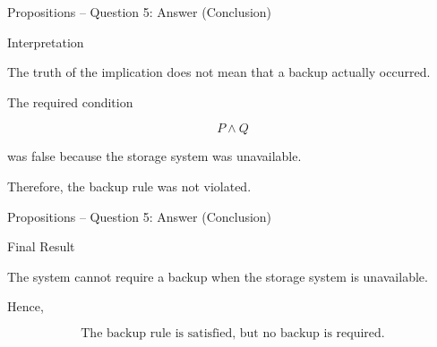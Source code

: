 
\begin{frame}{Propositions -- Question 5: Answer (Conclusion)}

\begin{exampleblock}{Interpretation}

The truth of the implication does not mean that a backup actually
occurred.

The required condition

$$
P\land Q
$$

was false because the storage system was unavailable.

Therefore, the backup rule was not violated.

\end{exampleblock}

\end{frame}

\begin{frame}{Propositions -- Question 5: Answer (Conclusion)}

\begin{exampleblock}{Final Result}

The system cannot require a backup when the storage system is
unavailable.

Hence,

$$
\boxed{\text{The backup rule is satisfied, but no backup is required.}}
$$

\end{exampleblock}

\end{frame}
